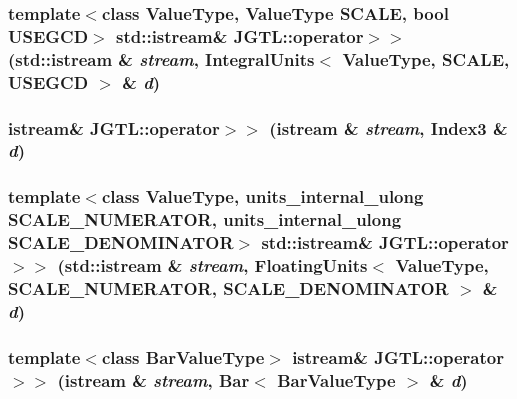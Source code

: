 \hypertarget{namespace_j_g_t_l_e2329341531898d1534dbc7ecb0b6a21}{
\subsubsection[operator$>$$>$]{\setlength{\rightskip}{0pt plus 5cm}template$<$class Value\-Type, Value\-Type SCALE, bool USEGCD$>$ std::istream\& JGTL::operator$>$$>$ (std::istream \& {\em stream}, Integral\-Units$<$ Value\-Type, SCALE, USEGCD $>$ \& {\em d})}}
\label{namespace_j_g_t_l_e2329341531898d1534dbc7ecb0b6a21}


\hypertarget{namespace_j_g_t_l_2b5020a887bfbfcf78f56c3181a47ace}{
\subsubsection[operator$>$$>$]{\setlength{\rightskip}{0pt plus 5cm}istream\& JGTL::operator$>$$>$ (istream \& {\em stream}, Index3 \& {\em d})}}
\label{namespace_j_g_t_l_2b5020a887bfbfcf78f56c3181a47ace}


\hypertarget{namespace_j_g_t_l_6c3aa6e2c845fd00bac1728506725fa8}{
\subsubsection[operator$>$$>$]{\setlength{\rightskip}{0pt plus 5cm}template$<$class Value\-Type, units\_\-internal\_\-ulong SCALE\_\-NUMERATOR, units\_\-internal\_\-ulong SCALE\_\-DENOMINATOR$>$ std::istream\& JGTL::operator$>$$>$ (std::istream \& {\em stream}, Floating\-Units$<$ Value\-Type, SCALE\_\-NUMERATOR, SCALE\_\-DENOMINATOR $>$ \& {\em d})}}
\label{namespace_j_g_t_l_6c3aa6e2c845fd00bac1728506725fa8}


\hypertarget{namespace_j_g_t_l_092a0993d280d2d4dbb45d96e9d40abc}{
\subsubsection[operator$>$$>$]{\setlength{\rightskip}{0pt plus 5cm}template$<$class Bar\-Value\-Type$>$ istream\& JGTL::operator$>$$>$ (istream \& {\em stream}, Bar$<$ Bar\-Value\-Type $>$ \& {\em d})}}
\label{namespace_j_g_t_l_092a0993d280d2d4dbb45d96e9d40abc}


